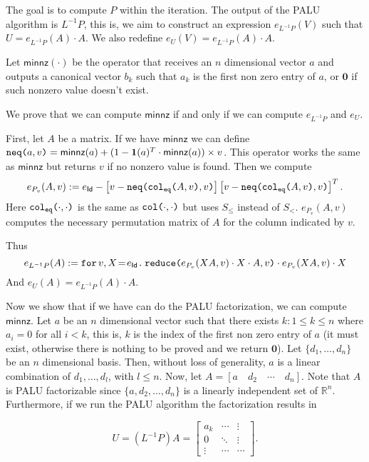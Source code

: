 The goal is to compute $P$ within the iteration. The output of the PALU algorithm is $L^{-1}P$, this is, we aim to construct an expression $e_{L^{-1}P}(V)$ such that $U=e_{L^{-1}P}(A)\cdot A$. We also redefine $e_U(V)=e_{L^{-1}P}(A)\cdot A$.

Let $\mathsf{minnz}(\cdot)$ be the operator that receives an $n$ dimensional vector $a$ and outputs a canonical vector $b_k$ such that $a_k$ is the first non zero entry of $a$, or $\mathbf{0}$ if such nonzero value doesn't exist. 

We prove that we can compute $\mathsf{minnz}$ if and only if we can compute $e_{L^{-1}P}$ and $e_{U}$.

First, let $A$ be a matrix. If we have $\mathsf{minnz}$ we can define $\nneq{a}{v} = \mathsf{minnz}(a) + (1 - \ones(a)^T\cdot \mathsf{minnz}(a))\times v$. This operator works the same as $\mathsf{minnz}$ but returns $v$ if no nonzero value is found.
Then we compute $$e_{P_v}(A,v) := e_{\mathsf{Id}} - \left[ v - \nneq{ \ccoleq{A}{v} }{v} \right]\left[ v - \nneq{ \ccoleq{A}{v} }{v} \right]^T.$$ Here $\ccoleq{\cdot}{\cdot}$ is the same as $\ccol{\cdot}{\cdot}$ but uses $S_{\leq}$ instead of $S_{<}$. $e_{P_v}(A,v)$ computes the necessary permutation matrix of $A$ for the column indicated by $v$.

Thus $$e_{L^{-1}P}(A):=\initf{e_{\mathsf{Id}}}{v}{X}{\red{e_{P_v}(XA,v)\cdot X\cdot A}{v}\cdot e_{P_v}(XA,v)\cdot X}$$
And $e_U(A)=e_{L^{-1}P}(A)\cdot A$.

Now we show that if we have can do the PALU factorization, we can compute $\mathsf{minnz}$. Let $a$ be an $n$ dimensional vector such that there exists $k:1\leq k\leq n$ where $a_i=0$ for all $i<k$, this is, $k$ is the index of the first non zero entry of $a$ (it must exist, otherwise there is nothing to be proved and we return $\mathbf{0}$). Let $\lbrace d_1, \ldots, d_n\rbrace$ be an $n$ dimensional basis. Then, without loss of generality, $a$ is a linear combination of $d_1, \ldots, d_l$, with $l \leq n$. Now, let $A = \left[ a\hspace{1em} d_2 \hspace{1em} \cdots \hspace{1em}  d_n \right].$ Note that $A$ is PALU factorizable since $\lbrace a, d_2, \ldots, d_n\rbrace$ is a linearly independent set of $\mathbb{R}^n$. Furthermore, if we run the PALU algorithm the factorization results in

\[
U=(L^{-1}P)A = \begin{bmatrix}
    a_k & \cdots &  \vdots \\
    0 & \ddots & \vdots \\
    \vdots & \cdots & \cdots 
\end{bmatrix}.
\]

